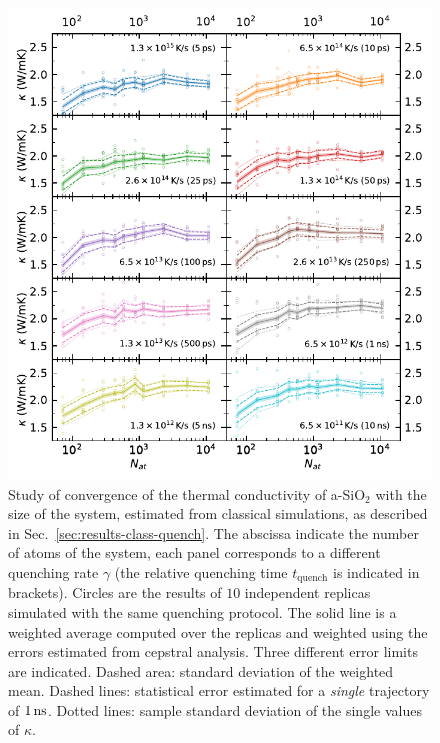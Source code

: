 \begin{figure}[!tb]
    \centering
    \includegraphics[width=\textwidth]{chapters/chapter6/figures/Silica_NVT_kappa_NATconv.pdf}
    \caption{Study of convergence of the thermal conductivity of a-SiO$_2$ with the size of the system, estimated from classical simulations, as described in Sec.~\ref{sec:results-class-quench}. 
    The abscissa indicate the number of atoms of the system, each panel corresponds to a different quenching rate $\gamma$ (the relative quenching time $t_\mathrm{quench}$ is indicated in brackets). 
    Circles are the results of $10$ independent replicas simulated with the same quenching protocol. The solid line is a weighted average computed over the replicas and weighted using the errors estimated from cepstral analysis. Three different error limits are indicated. 
    Dashed area: standard deviation of the weighted mean. 
    Dashed lines: statistical error estimated for a \emph{single} trajectory of $1\,\mathrm{ns}$. 
    Dotted lines: sample standard deviation of the single values of $\kappa$. 
    }
    \label{fig:results-class-kappa-vs-size}
\end{figure}

